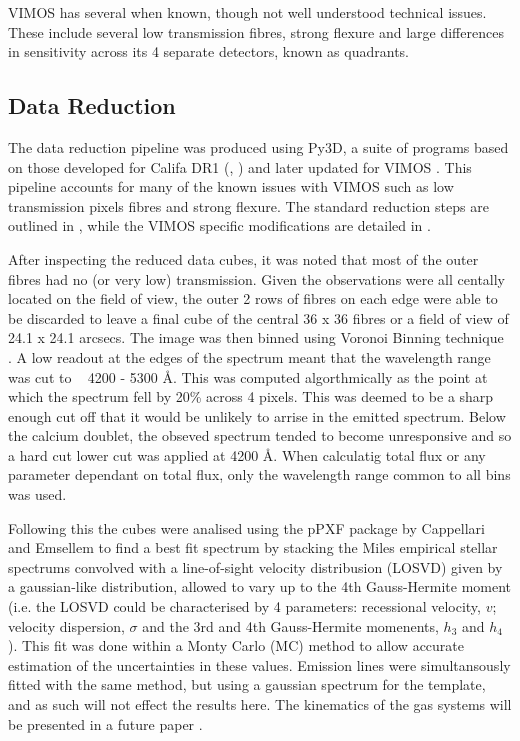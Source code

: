 \documentclass[a4paper,11pt]{article}
\begin{document}
		VIMOS has several when known, though not well understood technical issues. These include several low transmission fibres, strong flexure and large differences in sensitivity across its 4 separate detectors, known as quadrants.

	\subsection{Data Reduction}
		\label{subsec:reduct}
		The data reduction pipeline was produced using Py3D, a suite of programs based on those developed for Califa DR1 (\cite{Sanchez2011}, \cite{Husemann2013}) and later updated for VIMOS \cite{Husemann2014}. This pipeline accounts for many of the known issues with VIMOS such as low transmission pixels fibres and strong flexure. The standard reduction steps are outlined in \cite{Sanchez2011}, while the VIMOS specific modifications are detailed in \cite{Husemann2014}. 

		After inspecting the reduced data cubes, it was noted that most of the outer fibres had no (or very low) transmission. Given the observations were all centally located on the field of view, the outer 2 rows of fibres on each edge were able to be discarded to leave a final cube of the central 36 x 36 fibres or a field of view of 24.1 x 24.1 arcsecs. The image was then binned using Voronoi Binning technique \cite{Cappellari2003}. A low readout at the edges of the spectrum meant that the wavelength range was cut to ~ 4200 - 5300 \AA. This was computed algorthmically as the point at which the spectrum fell by 20\% across 4 pixels. This was deemed to be a sharp enough cut off that it would be unlikely to arrise in the emitted spectrum. Below the calcium doublet, the obseved spectrum tended to become unresponsive and so a hard cut lower cut was applied at 4200 \AA. When calculatig total flux or any parameter dependant on total flux, only the wavelength range common to all bins was used.

		Following this the cubes were analised using the pPXF package by Cappellari and Emsellem \cite{Cappellari2004} to find a best fit spectrum by stacking the Miles empirical stellar spectrums \cite{Miles} convolved with a line-of-sight velocity distribusion (LOSVD) given by a gaussian-like distribution, allowed to vary up to the 4th Gauss-Hermite moment (i.e. the LOSVD could be characterised by 4 parameters: recessional velocity, $v$; velocity dispersion, $\sigma$ and the 3rd and 4th Gauss-Hermite momenents, $h_3$ and $h_4$). This fit was done within a Monty Carlo (MC) method to allow accurate estimation of the uncertainties in these values. Emission lines were simultansously fitted with the same method, but using a gaussian spectrum for the template, and as such will not effect the results here. The kinematics of the gas systems will be presented in a future paper \cite{warren2017}. 
\end{document}
